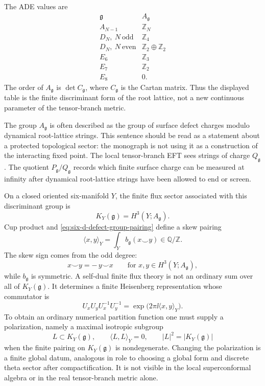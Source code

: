 The ADE values are
\begin{equation}
\begin{array}{c|c}
  \mathfrak g & A_{\mathfrak g}\\ \hline
  A_{N-1} & \mathbb Z_N\\
  D_N,\ N\ \text{odd} & \mathbb Z_4\\
  D_N,\ N\ \text{even} & \mathbb Z_2\oplus\mathbb Z_2\\
  E_6 & \mathbb Z_3\\
  E_7 & \mathbb Z_2\\
  E_8 & 0 .
\end{array}
\label{eq:six-d-ade-defect-groups}
\end{equation}
The order of \(A_{\mathfrak g}\) is \(\det C_{\mathfrak g}\), where
\(C_{\mathfrak g}\) is the Cartan matrix.  Thus the displayed table is the
finite discriminant form of the root lattice, not a new continuous parameter
of the tensor-branch metric.

The group \(A_{\mathfrak g}\) is often described as the group of surface
defect charges modulo dynamical root-lattice strings.  This sentence should
be read as a statement about a protected topological sector: the monograph is
not using it as a construction of the interacting fixed point.  The local
tensor-branch EFT sees strings of charge \(Q_{\mathfrak g}\).  The quotient
\(P_{\mathfrak g}/Q_{\mathfrak g}\) records which finite surface charge can
be measured at infinity after dynamical root-lattice strings have been
allowed to end or screen.

On a closed oriented six-manifold \(Y\), the finite flux sector associated
with this discriminant group is
\begin{equation}
  K_Y(\mathfrak g)=H^3(Y;A_{\mathfrak g}) .
  \label{eq:six-d-finite-flux-group}
\end{equation}
Cup product and \eqref{eq:six-d-defect-group-pairing} define a skew pairing
\begin{equation}
  \langle x,y\rangle_Y
  =
  \int_Y b_{\mathfrak g}(x\smile y)
  \in\mathbb Q/\mathbb Z .
  \label{eq:six-d-finite-flux-pairing}
\end{equation}
The skew sign comes from the odd degree:
\[
  x\smile y=-\,y\smile x
  \qquad\text{for }x,y\in H^3(Y;A_{\mathfrak g}),
\]
while \(b_{\mathfrak g}\) is symmetric.  A self-dual finite flux theory is
not an ordinary sum over all of \(K_Y(\mathfrak g)\).  It determines a finite
Heisenberg representation whose commutator is
\[
  U_xU_yU_x^{-1}U_y^{-1}
  =
  \exp\!\bigl(2\pi\ii\langle x,y\rangle_Y\bigr).
\]
To obtain an ordinary numerical partition function one must supply a
polarization, namely a maximal isotropic subgroup
\[
  L\subset K_Y(\mathfrak g),
  \qquad
  \langle L,L\rangle_Y=0,
  \qquad
  |L|^2=|K_Y(\mathfrak g)|
\]
when the finite pairing on \(K_Y(\mathfrak g)\) is nondegenerate.  Changing
the polarization is a finite global datum, analogous in role to choosing a
global form and discrete theta sector after compactification.  It is not
visible in the local superconformal algebra or in the real tensor-branch
metric alone.

